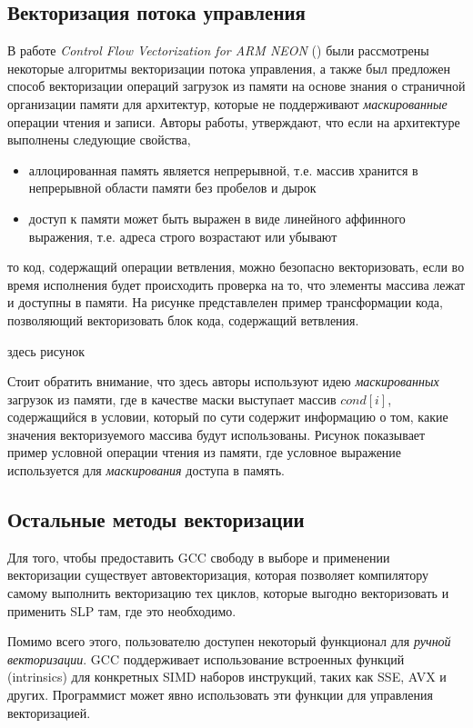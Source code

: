 \subsection{Векторизация потока управления}
В работе \textit{Control Flow Vectorization for ARM NEON} (\todo[ссылка]) были рассмотрены некоторые алгоритмы векторизации потока управления, а также был предложен способ векторизации операций загрузок из памяти на основе знания о страничной организации памяти для архитектур, которые не поддерживают \textit{маскированные} операции чтения и записи. Авторы работы, утверждают, что если на архитектуре выполнены следующие свойства,

\begin{itemize}
    \item аллоцированная память является непрерывной, т.е. массив хранится в непрерывной области памяти без пробелов и дырок
    \item доступ к памяти может быть выражен в виде линейного аффинного выражения, т.е. адреса строго возрастают или убывают
\end{itemize}

то код, содержащий операции ветвления, можно безопасно векторизовать, если во время исполнения будет происходить проверка на то, что элементы массива лежат и доступны в памяти. На рисунке \todo[рисунок] представлелен пример трансформации кода, позволяющий векторизовать блок кода, содержащий ветвления.

здесь рисунок

Стоит обратить внимание, что здесь авторы используют идею \textit{маскированных} загрузок из памяти, где в качестве маски выступает массив $cond[i]$, содержащийся в условии, который по сути содержит информацию о том, какие значения векторизуемого массива будут использованы. Рисунок \todo[рисунок] показывает пример условной операции чтения из памяти, где условное выражение используется для \textit{маскирования} доступа в память.

\subsection{Остальные методы векторизации}
Для того, чтобы предоставить GCC свободу в выборе и применении векторизации существует автовекторизация, которая позволяет компилятору самому выполнить векторизацию тех циклов, которые выгодно векторизовать и применить SLP там, где это необходимо. 

Помимо всего этого, пользователю доступен некоторый функционал для \textit{ручной векторизации}. GCC поддерживает использование встроенных функций (intrinsics) для конкретных SIMD наборов инструкций, таких как SSE, AVX и других. Программист может явно использовать эти функции для управления векторизацией.

